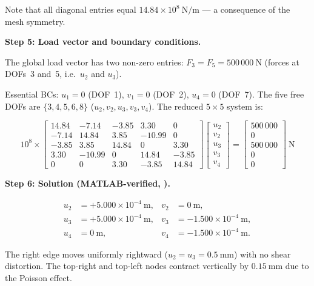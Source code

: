 \begin{example}
Note that all diagonal entries equal $14.84 \times 10^8\ \text{N/m}$ --- a
consequence of the mesh symmetry.

\medskip
\noindent\textbf{Step 5: Load vector and boundary conditions.}

The global load vector has two non-zero entries:
$F_3 = F_5 = 500\,000\ \text{N}$ (forces at DOFs~3 and~5, i.e.\ $u_2$ and $u_3$).

Essential BCs: $u_1 = 0$ (DOF~1), $v_1 = 0$ (DOF~2), $u_4 = 0$ (DOF~7).
The five free DOFs are $\{3,4,5,6,8\}$ ($u_2, v_2, u_3, v_3, v_4$). The
reduced $5\times5$ system is:

\begin{equation}
    10^8 \times
    \begin{bmatrix}
        14.84 & -7.14  & -3.85  &  3.30  &  0     \\
        -7.14 & 14.84  &  3.85  & -10.99 &  0     \\
        -3.85 &  3.85  & 14.84  &  0     &  3.30  \\
         3.30 & -10.99 &  0     & 14.84  & -3.85  \\
         0    &  0     &  3.30  & -3.85  & 14.84
    \end{bmatrix}
    \begin{bmatrix} u_2 \\ v_2 \\ u_3 \\ v_3 \\ v_4 \end{bmatrix}
    =
    \begin{bmatrix} 500\,000 \\ 0 \\ 500\,000 \\ 0 \\ 0 \end{bmatrix}\ \text{N}
    \label{eq:Kff_cst}
\end{equation}

\medskip
\noindent\textbf{Step 6: Solution (MATLAB-verified, ).}

\begin{align*}
    u_2 &= +5.000\times10^{-4}\ \text{m}, &
    v_2 &= 0\ \text{m}, \\
    u_3 &= +5.000\times10^{-4}\ \text{m}, &
    v_3 &= -1.500\times10^{-4}\ \text{m}, \\
    u_4 &= 0\ \text{m}, &
    v_4 &= -1.500\times10^{-4}\ \text{m}.
\end{align*}

The right edge moves uniformly rightward ($u_2 = u_3 = 0.5\ \text{mm}$) with
no shear distortion. The top-right and top-left nodes contract vertically by
$0.15\ \text{mm}$ due to the Poisson effect.


\end{example}
